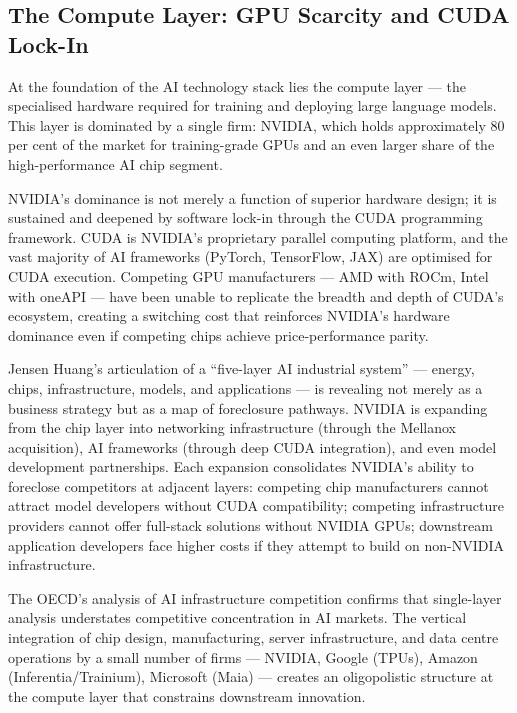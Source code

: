 \subsection{The Compute Layer: GPU Scarcity and CUDA Lock-In}

At the foundation of the AI technology stack lies the compute layer --- the specialised hardware required for training and deploying large language models. This layer is dominated by a single firm: NVIDIA, which holds approximately 80 per cent of the market for training-grade GPUs and an even larger share of the high-performance AI chip segment.

NVIDIA's dominance is not merely a function of superior hardware design; it is sustained and deepened by software lock-in through the CUDA programming framework. CUDA is NVIDIA's proprietary parallel computing platform, and the vast majority of AI frameworks (PyTorch, TensorFlow, JAX) are optimised for CUDA execution. Competing GPU manufacturers --- AMD with ROCm, Intel with oneAPI --- have been unable to replicate the breadth and depth of CUDA's ecosystem, creating a switching cost that reinforces NVIDIA's hardware dominance even if competing chips achieve price-performance parity.

Jensen Huang's articulation of a ``five-layer AI industrial system'' --- energy, chips, infrastructure, models, and applications --- is revealing not merely as a business strategy but as a map of foreclosure pathways. NVIDIA is expanding from the chip layer into networking infrastructure (through the Mellanox acquisition), AI frameworks (through deep CUDA integration), and even model development partnerships. Each expansion consolidates NVIDIA's ability to foreclose competitors at adjacent layers: competing chip manufacturers cannot attract model developers without CUDA compatibility; competing infrastructure providers cannot offer full-stack solutions without NVIDIA GPUs; downstream application developers face higher costs if they attempt to build on non-NVIDIA infrastructure.

The OECD's analysis of AI infrastructure competition confirms that single-layer analysis understates competitive concentration in AI markets. The vertical integration of chip design, manufacturing, server infrastructure, and data centre operations by a small number of firms --- NVIDIA, Google (TPUs), Amazon (Inferentia/Trainium), Microsoft (Maia) --- creates an oligopolistic structure at the compute layer that constrains downstream innovation.

